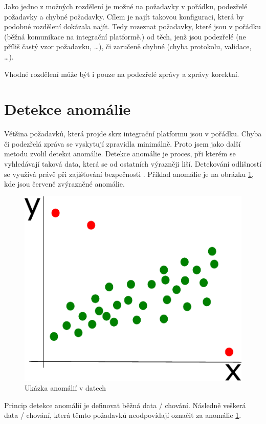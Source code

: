 \documentclass[thesis=M,czech]{FITthesis}[2012/10/20]
\newcommand{\tmpframe}[1]{\fbox{#1}}
\renewcommand{\tmpframe}[1]{#1}
\begin{document}
			Jako jedno z možných rozdělení je možné na požadavky v pořádku, podezřelé požadavky a chybné požadavky. Cílem je najít takovou konfiguraci, která by podobné rozdělení dokázala najít. Tedy rozeznat požadavky, které jsou v pořádku (běžná komunikace na integrační platformě.) od těch, jenž jsou podezřelé (ne příliš častý vzor požadavku, \ldots), či zaručeně chybné (chyba protokolu, validace, \ldots). 
			
			Vhodné rozdělení může být i pouze na podezřelé zprávy a zprávy korektní.		
	
	\section{Detekce anomálie}
		Většina požadavků, která projde skrz integrační platformu jsou v pořádku. Chyba či podezřelá zpráva se vyskytují zpravidla minimálně. Proto jsem jako další metodu zvolil detekci anomálie. Detekce anomálie je proces, při kterém se vyhledávají taková data, která se od ostatních výrazněji liší. Detekování odlišností se využívá právě při zajišťování bezpečnosti \cite{AnomDetectPCA}. Příklad anomálie je na obrázku \ref{fig:anomalyInData}, kde jsou červeně zvýrazněné anomálie.
		
		\begin{figure}[htb]\centering
			\tmpframe{\includegraphics[scale=0.8]{./img/outlier}}		
			\caption{Ukázka anomálií v datech}
			\label{fig:anomalyInData}
		\end{figure}
	
		Princip detekce anomálií je definovat běžná data / chování. Následně veškerá data / chování, která těmto požadavků neodpovídají označit za anomálie \ref{fig:anomalyInData}. 
		
\end{document}
